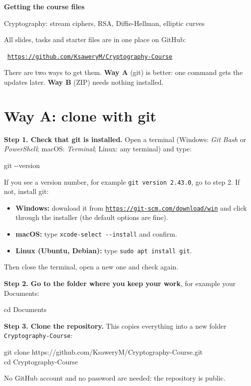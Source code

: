 \documentclass[11pt,a4paper]{article}
\newcommand{\link}[1]{\href{#1}{\textcolor{link}{\texttt{#1}}}}
\begin{document}
{\LARGE\bfseries\color{ink} Getting the course files}\par\vspace{2pt}
{\large Cryptography: stream ciphers, RSA, Diffie-Hellman, elliptic curves}\par\vspace{6pt}
All slides, tasks and starter files are in one place on GitHub:\par
\begin{center}\Large\faGithub\ \link{https://github.com/KsaweryM/Cryptography-Course}\end{center}
There are two ways to get them. \textbf{Way A} (git) is better: one command gets the updates later.
\textbf{Way B} (ZIP) needs nothing installed.

\section{Way A: clone with git}

\textbf{Step 1. Check that git is installed.} Open a terminal
(Windows: \emph{Git Bash} or \emph{PowerShell}; macOS: \emph{Terminal}; Linux: any terminal) and type:
\begin{terminal}
git -{}-version
\end{terminal}
If you see a version number, for example \texttt{git version 2.43.0}, go to step 2.
If not, install git:
\begin{itemize}[nosep, leftmargin=1.4em]
  \item \textbf{Windows:} download it from \link{https://git-scm.com/download/win} and click through the installer (the default options are fine).
  \item \textbf{macOS:} type \texttt{xcode-select -{}-install} and confirm.
  \item \textbf{Linux (Ubuntu, Debian):} type \texttt{sudo apt install git}.
\end{itemize}
Then close the terminal, open a new one and check again.

\textbf{Step 2. Go to the folder where you keep your work}, for example your Documents:
\begin{terminal}
cd Documents
\end{terminal}

\textbf{Step 3. Clone the repository.} This copies everything into a new folder \texttt{Cryptography-Course}:
\begin{terminal}
git clone https://github.com/KsaweryM/Cryptography-Course.git\\
cd Cryptography-Course
\end{terminal}
No GitHub account and no password are needed: the repository is public.
\end{document}
